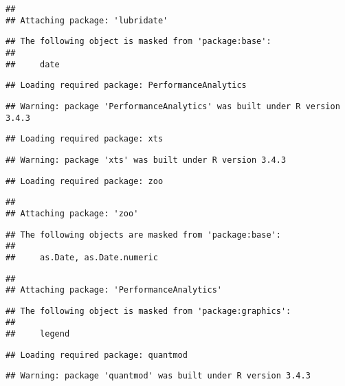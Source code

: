 \documentclass[]{article}
\begin{document}
\begin{verbatim}
## 
## Attaching package: 'lubridate'
\end{verbatim}

\begin{verbatim}
## The following object is masked from 'package:base':
## 
##     date
\end{verbatim}

\begin{verbatim}
## Loading required package: PerformanceAnalytics
\end{verbatim}

\begin{verbatim}
## Warning: package 'PerformanceAnalytics' was built under R version 3.4.3
\end{verbatim}

\begin{verbatim}
## Loading required package: xts
\end{verbatim}

\begin{verbatim}
## Warning: package 'xts' was built under R version 3.4.3
\end{verbatim}

\begin{verbatim}
## Loading required package: zoo
\end{verbatim}

\begin{verbatim}
## 
## Attaching package: 'zoo'
\end{verbatim}

\begin{verbatim}
## The following objects are masked from 'package:base':
## 
##     as.Date, as.Date.numeric
\end{verbatim}

\begin{verbatim}
## 
## Attaching package: 'PerformanceAnalytics'
\end{verbatim}

\begin{verbatim}
## The following object is masked from 'package:graphics':
## 
##     legend
\end{verbatim}

\begin{verbatim}
## Loading required package: quantmod
\end{verbatim}

\begin{verbatim}
## Warning: package 'quantmod' was built under R version 3.4.3
\end{verbatim}
\end{document}
